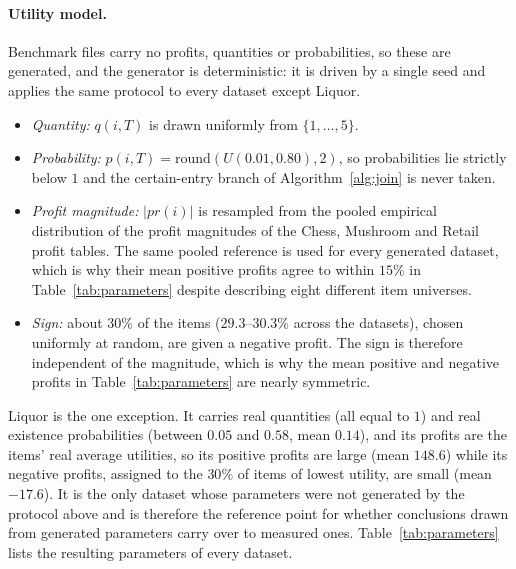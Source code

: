 \documentclass[pdflatex,sn-vancouver-num]{sn-jnl}
\theoremstyle{thmstyleone}%
\theoremstyle{thmstyletwo}%
\theoremstyle{thmstylethree}%
\newcommand{\pr}{\mathit{pr}}
\newcommand{\qty}{q}
\newcommand{\prob}{p}
\begin{document}
\paragraph{Utility model.}
Benchmark files carry no profits, quantities or probabilities, so these
are generated, and the generator is deterministic: it is driven by a
single seed and applies the same protocol to every dataset except Liquor.
\begin{itemize}
\item \emph{Quantity:} $\qty(i,T)$ is drawn uniformly from $\{1,\dots,5\}$.
\item \emph{Probability:} $\prob(i,T)=\mathrm{round}(U(0.01,0.80),2)$, so
      probabilities lie strictly below $1$ and the certain-entry branch of
      Algorithm~\ref{alg:join} is never taken.
\item \emph{Profit magnitude:} $|\pr(i)|$ is resampled from the pooled
      empirical distribution of the profit magnitudes of the Chess,
      Mushroom and Retail profit tables. The same pooled reference is
      used for every generated dataset, which is why their mean positive
      profits agree to within $15\%$ in Table~\ref{tab:parameters}
      despite describing eight different item universes.
\item \emph{Sign:} about $30\%$ of the items ($29.3$--$30.3\%$ across
      the datasets), chosen uniformly at random, are given a negative profit. The sign is therefore independent of
      the magnitude, which is why the mean positive and negative profits
      in Table~\ref{tab:parameters} are nearly symmetric.
\end{itemize}
Liquor is the one exception. It carries real quantities (all equal to
$1$) and real existence probabilities (between $0.05$ and $0.58$, mean
$0.14$), and its profits are the items' real average utilities, so its
positive profits are large (mean $148.6$) while its negative profits,
assigned to the $30\%$ of items of lowest utility, are small
(mean $-17.6$). It is the only dataset whose parameters were not
generated by the protocol above and is therefore the reference point for
whether conclusions drawn from generated parameters carry over to
measured ones. Table~\ref{tab:parameters} lists the resulting parameters of
every dataset.
 
\end{document}
